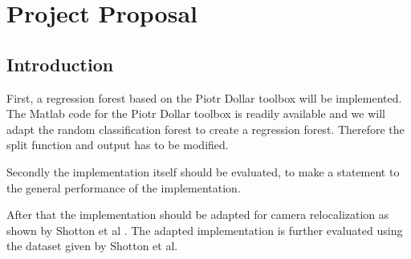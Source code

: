 %





\newcommand{\TUGn}{Graz University of Technology}

\address[ICG]{Inst. for Computer Graphics and Vision \\ \TUGn, Austria}



















\section{Project Proposal}

\subsection{Introduction} %
\label{sub:intro}
First, a regression forest based on the Piotr Dollar toolbox \cite{piotr} will be implemented. The Matlab code for the Piotr Dollar toolbox is readily available and we will adapt the random classification forest to create a regression forest. Therefore the split function and output has to be modified.

Secondly the implementation itself should be evaluated, to make a statement to the general performance of the implementation.

After that the implementation should be adapted for camera relocalization as shown by Shotton et al \cite{shotton}. The adapted implementation is further evaluated using the dataset given by Shotton et al.

